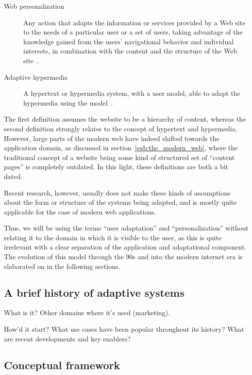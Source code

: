 \begin{description}
    \item[Web personalization] Any action that adapts the information or services provided by a Web site to the needs of a particular user or a set of users, taking advantage of the knowledge gained from the users' navigational behavior and individual interests, in combination with the content and the structure of the Web site~\cite{Eirinaki2003}.
    \item[Adaptive hypermedia] A hypertext or hypermedia system, with a user model, able to adapt the hypermedia using the model~\cite{Brusilovsky1996}.
\end{description}

The first definition assumes the website to be a hierarchy of content, whereas the second definition strongly relates to the concept of hypertext and hypermedia. However, large parts of the modern web have indeed shifted towards the application domain, as discussed in section~\ref{sub:the_modern_web}, where the traditional concept of a website being some kind of structured set of ``content pages'' is completely outdated. In this light, these definitions are both a bit dated.

Recent research, however, usually does not make these kinds of assumptions about the form or structure of the systems being adapted, and is mostly quite applicable for the case of modern web applications.

Thus, we will be using the terms ``user adaptation'' and ``personalization'' without relating it to the domain in which it is visible to the user, as this is quite irrelevant with a clear separation of the application and adaptational component. The evolution of this model through the 90s and into the modern internet era is elaborated on in the following sections.


\subsection{A brief history of adaptive systems}
\label{sub:adaptive_systems_history}

What is it? Other domains where it's used (marketing).

How'd it start? What use cases have been popular throughout its history? What are recent developments and key enablers?

\subsection{Conceptual framework}

